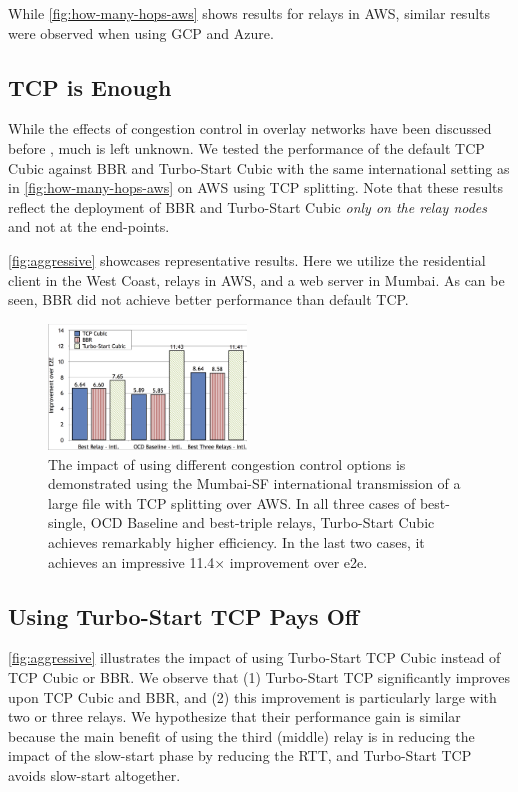 \documentclass[newfonts=false,format=sigconf,10pt,letterpaper]{acmart}
\begin{document}
While \autoref{fig:how-many-hops-aws} shows results for relays in AWS, similar results were observed when using GCP and Azure.

\subsection{TCP is Enough} 
While the effects of congestion control in overlay networks have been discussed before \cite{CRONets}, much is left unknown.
We tested the performance of the default TCP Cubic against BBR and Turbo-Start Cubic with the same international setting as in \autoref{fig:how-many-hops-aws} on AWS using TCP splitting. Note that these results reflect the deployment of BBR and Turbo-Start Cubic \textit{only on the relay nodes} and not at the end-points.

\autoref{fig:aggressive}
showcases representative results. Here we utilize the residential client in the West Coast, relays in AWS, and a web server in Mumbai. As can be seen, BBR did not achieve better performance than default TCP.

\begin{figure}
  \centering
    \includegraphics[width=0.47\textwidth,trim=2mm 2mm 2mm 2mm,clip]{figures/aggressive.png}
    \caption{%
    The impact of using different congestion control options is demonstrated using the Mumbai-SF international transmission of a large file with TCP splitting over AWS. In all three cases of best-single, OCD Baseline and best-triple relays, Turbo-Start Cubic achieves remarkably higher efficiency. In the last two cases, it achieves an impressive 11.4$\times$ improvement over e2e.
   }
    \label{fig:aggressive}
\end{figure}

\subsection{Using Turbo-Start TCP Pays Off}\label{subsec:quick-start}
\autoref{fig:aggressive} illustrates the impact of using Turbo-Start TCP Cubic  instead of TCP Cubic or BBR.
We observe that (1) Turbo-Start TCP significantly improves upon TCP Cubic and BBR, and (2) this improvement is particularly large with two or three relays. We hypothesize that their performance gain is similar because the main benefit of using the third (middle) relay is in reducing the impact of the slow-start phase by reducing the RTT, and Turbo-Start TCP avoids slow-start altogether.
\end{document}
